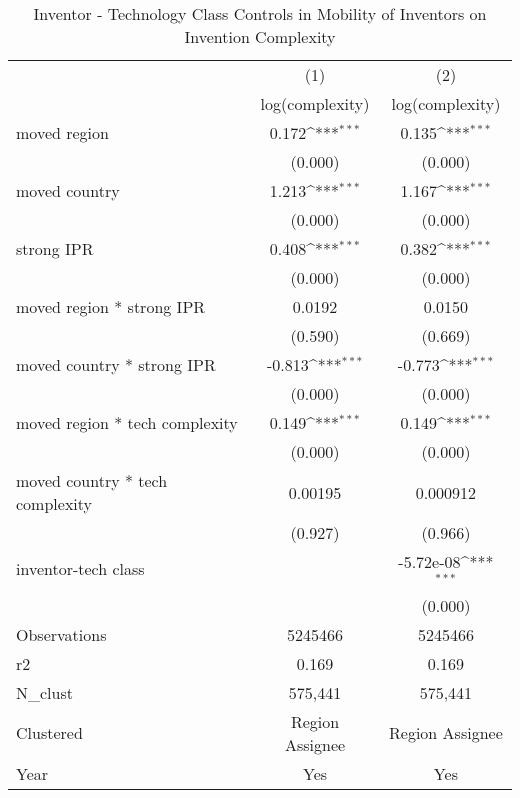 {
\def\sym#1{\ifmmode^{#1}\else\(^{#1}\)\fi}
\begin{longtable}{l*{2}{c}}
\caption{Inventor - Technology Class Controls in Mobility of Inventors on Invention Complexity \label{model6a6b6c}}\\
\hline\hline\endfirsthead\hline\endhead\hline\endfoot\endlastfoot
                &\multicolumn{1}{c}{(1)}&\multicolumn{1}{c}{(2)}\\
                &\multicolumn{1}{c}{log(complexity)}&\multicolumn{1}{c}{log(complexity)}\\
\hline
moved region    &    0.172\sym{***}&    0.135\sym{***}\\
                &  (0.000)         &  (0.000)         \\
moved country   &    1.213\sym{***}&    1.167\sym{***}\\
                &  (0.000)         &  (0.000)         \\
strong IPR      &    0.408\sym{***}&    0.382\sym{***}\\
                &  (0.000)         &  (0.000)         \\
moved region * strong IPR&   0.0192         &   0.0150         \\
                &  (0.590)         &  (0.669)         \\
moved country * strong IPR&   -0.813\sym{***}&   -0.773\sym{***}\\
                &  (0.000)         &  (0.000)         \\
moved region * tech complexity&    0.149\sym{***}&    0.149\sym{***}\\
                &  (0.000)         &  (0.000)         \\
moved country * tech complexity&  0.00195         & 0.000912         \\
                &  (0.927)         &  (0.966)         \\
inventor-tech class&                  &-5.72e-08\sym{***}\\
                &                  &  (0.000)         \\
\hline
Observations    &  5245466         &  5245466         \\
r2              &    0.169         &    0.169         \\
N\_clust         &  575,441         &  575,441         \\
Clustered       &Region Assignee         &Region Assignee         \\
Year            &      Yes         &      Yes         \\

\end{longtable}}
